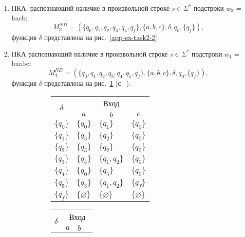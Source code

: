 \begin{enumerate}[label=(\roman{*})]
\begin{enumerate}
		
		\item НКА, распознающий наличие в произвольной строке $s \in \Sigma^*$ подстроки $w_3$ = bacb:
		\[
            M^{ND}_3 = (\{q_0, q_1, q_2, q_3, q_4, q_f\}, \{a, b, c\}, \delta, q_0, \{q_f\}),
        \]
		функция $\delta$ представлена на рис.~\ref{app-ex-task2-2}.
        
		\item НКА распознающий наличие в произвольной строке $s \in \Sigma^*$ подстроки $w_4$ = baabc:
		\[
            M^{ND}_4 = (\{q_0, q_1, q_2, q_3, q_4, q_5, q_f\}, \{a, b, c\}, \delta, q_0, \{q_f\}),
        \]
        функция $\delta$ представлена на рис.~\ref{app-ex-task2-4} (с.~\pageref{app-ex-task2-4}).

\begin{figure}
\centering
\begin{subfigure}[b]{.4\linewidth}
\centering
			\begin{tabular}{llll}
				\toprule
				\multicolumn{1}{c}{\multirow{2}{*}{\Large $\delta$}}
				& \multicolumn{3}{c}{Вход} \\
				\cmidrule(rl){2-4}
				& \multicolumn{1}{c}{$a$}
				& \multicolumn{1}{c}{$b$} 
				& \multicolumn{1}{c}{$c$} \\
				\midrule
				$\{q_0\}$       & $\{q_0\}$      		 & $\{q_1\}$     &$\{q_0\}$  \\
				$\{q_1\}$       & $\{q_3\}$    			 & $\{q_2\}$     &$\{q_0\}$ \\
				$\{q_2\}$       & $\{q_3\}$    			 & $\{q_2\}$     &$\{q_0\}$  \\
				$\{q_3\}$       & $\{q_4\}$    			 & $\{q_1, q_2\}$     &$\{q_0\}$  \\
				$\{q_4\}$       & $\{q_0\}$    			 & $\{q_5\}$     &$\{q_0\}$  \\
				$\{q_5\}$       & $\{q_3\}$    			 & $\{q_1, q_2\}$     &$\{q_f\}$  \\
				$\{q_f\}$       & $\{\varnothing\}$    	 & $\{\varnothing\}$     &$\{\varnothing\}$  \\
				\bottomrule
			\end{tabular}
\caption{}\label{app-ex-task2-4}
\end{subfigure}%
%
\begin{subfigure}[b]{.4\linewidth}
\centering
			\begin{tabular}{llll}
				\toprule
				\multicolumn{1}{c}{\multirow{2}{*}{\Large $\delta$}}
				& \multicolumn{3}{c}{Вход} \\
				\cmidrule(rl){2-4}
				& \multicolumn{1}{c}{$a$}
				& \multicolumn{1}{c}{$b$} 

\end{tabular}
\end{subfigure}
\end{figure}
\end{enumerate}
\end{enumerate}
